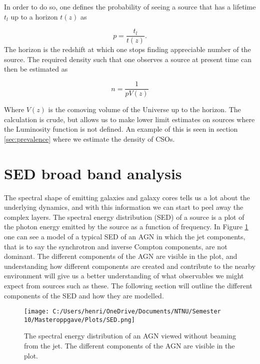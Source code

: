 In order to do so, one defines the probability of seeing a source that has a lifetime $t_l $ up to a horizon $t(z)$ as 

\begin{equation}
    p = \frac{t_l}{t(z)}.
\end{equation}
The horizon is the redshift at which one stops finding appreciable number of the source. The required density such that one observes a source at present time can then be estimated as 

\begin{equation}
    n = \frac{1}{p V(z)} 
\end{equation}

Where $V(z)$ is the comoving volume of the Universe up to the horizon.
The calculation is crude, but allows us to make lower limit estimates on sources where the Luminosity function is not defined. An example of this is seen in section \ref{sec:prevalence} where we estimate the density of CSOs.


\section{SED broad band analysis}
The spectral shape of emitting galaxies and galaxy cores tells us a lot about the underlying dynamics, and with this information we can start to peel away the complex layers. The spectral energy distribution (SED) of a source is a plot of the photon energy emitted by the source as a function of frequency. In Figure \ref{fig:AGN_SED} one can see a model of a typical SED of an AGN in which the jet components, that is to say the synchrotron and inverse Compton components, are not dominant. The different components of the AGN are visible in the plot, and understanding how different components are created and contribute to the nearby environment will give us a better understanding of what observables we might expect from sources such as these. The following section will outline the different components of the SED and how they are modelled.

\begin{figure}
    \centering
    \texttt{[image: C:/Users/henri/OneDrive/Documents/NTNU/Semester 10/Masteroppgave/Plots/SED.png]}
    \caption{The spectral energy distribution of an AGN viewed without beaming from the jet. The different components of the AGN are visible in the plot.}
    \label{fig:AGN_SED}
\end{figure}


